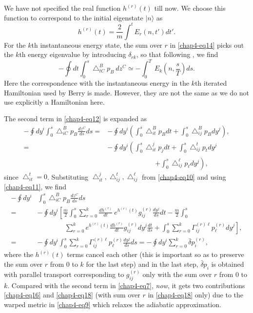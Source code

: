 We have not specified the real function $h^{(r)}(t)$ till now. We choose this function to correspond to the initial
eigenstate $|n\rangle$ as 
\begin{equation}
h^{(r)}(t)= \frac{2}{m}\int^t E_r(n,t') dt'.\label{chap4-eq15}
\end{equation}
For the $k$th instantaneous energy state, the sum over $r$ in \eqref{chap4-eq14} picks out the $k$th energy eigenvalue by  introducing ${\delta}_{rk}$, so that following \cite{key2}, we find 
\begin{equation}
-\oint dt \int_0^s {\bigtriangleup}^B_{tC}p_B\ dz^C\simeq -\int_0^T\ E_k(n,\frac{s}{T}) ds. \label{chap4-eq16}
\end{equation}
Here the correspondence with the instantaneous energy in the $k$th iterated Hamiltonian used by Berry \cite{key5} is made. However, they are not the same as we do not use explicitly a Hamiltonian here.

The second term in \eqref{chap4-eq12} is expanded as  
\begin{align}
	-\oint dy^i\int_0^s{\bigtriangleup}^B_{iC} p_B\frac{dz^C}{ds}ds= &-\oint dy^i\left( \int_0^s {\bigtriangleup}^B_{it}
	p_B dt+\int_0^s{\bigtriangleup}^B_{ij}p_B dy^j\right), \nonumber \\
	= &-\oint dy^i\left(\int_0^s{\bigtriangleup}^j_{it}p_j dt+\int_0^s{\bigtriangleup}^t_{ij}p_t dy^j \right. \nonumber \\
	& \qquad \qquad \qquad \quad \left.+\int_0^s {\bigtriangleup}^{\ell}_{ij}p_{\ell} dy^j\right),\label{chap4-eq17}
\end{align}
since ${\bigtriangleup}^t_{it}=0$. Substituting ${\bigtriangleup}^j_{it}, {\bigtriangleup}^t_{ij},{\bigtriangleup}^{\ell}
_{ij}$ from \eqref{chap4-eq10} and using \eqref{chap4-eq11}, we find 
\begin{align}
	-\oint dy^i & \int_0^s{\bigtriangleup}^B_{iC} p_B\frac{dz^C}{ds}ds\nonumber \\
	= &-\oint dy^i \left[ \frac{m}{2}\int_0^s \sum_{r=0}^k\frac{dh^{(r)}}{dt}\ e^{h^{(r)}(t)}g^{(r)}_{ij}\frac{dy^j}{ds} dt -\frac{m}{2}\int_0^s\right.\nonumber\\ 
	& \qquad \qquad  \left.\sum_{r=0}^k e^{h^{(r)}(t)}\frac{dh^{(r)}}{dt}g^{(r)}_{ij} dy^j\frac{dt}{ds} + \int_0^s\sum_{r=0}^k{\Gamma}^{(r) \ell}_{ij}p_{\ell}^{(r)} dy^j \right], \nonumber \\
	= &-\oint dy^i\int_0^s\sum_{r=0}^k {\Gamma}^{(r)\ell}_{ij}p^{(r)}_{\ell}\frac{dy^j}{ds} ds
	= -\oint dy^i\sum_{r=0}^k \bar{\delta} p_i^{(r)}, \label{chap4-eq18}
\end{align}
where the $h^{(r)}(t)$ terms cancel each other (this is important so as to preserve the sum over $r$ from $0$ to $k$ for  the last step) and in the last step, $\bar{\delta}p_i$ is  obtained with parallel transport corresponding to $g^{(r)}_{ij}$ only with the sum over $r$ from $0$ to $k$.  Compared with the second term in \eqref{chap4-eq7},  {\it{now}}, it gets two contributions \eqref{chap4-eq16} and \eqref{chap4-eq18} (with sum over $r$ in \eqref{chap4-eq18} only)   due to the warped metric in \eqref{chap4-eq9} which relaxes the adiabatic approximation.

